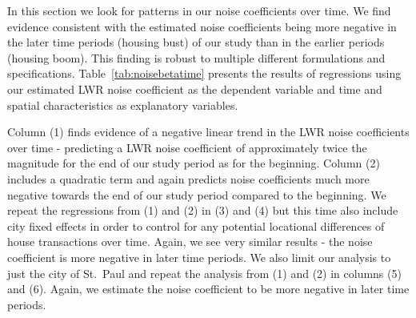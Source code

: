 \documentclass{article}\usepackage{graphicx, color}
\begin{document}
In this section we look for patterns in our noise coefficients over time. We find evidence consistent with the estimated noise coefficients being more negative in the later time periods (housing bust) of our study than in the earlier periods (housing boom). This finding is robust to multiple different formulations and specifications. Table~\ref{tab:noisebetatime} presents the results of regressions using our estimated LWR noise coefficient as the dependent variable and time and spatial characteristics as explanatory variables.

Column (1) finds evidence of a negative linear trend in the LWR noise coefficients over time - predicting a LWR noise coefficient of approximately twice the magnitude for the end of our study period as for the beginning. Column (2) includes a quadratic term and again predicts noise coefficients much more negative towards the end of our study period compared to the beginning. We repeat the regressions from (1) and (2) in (3) and (4) but this time also include city fixed effects in order to control for any potential locational differences of house transactions over time. Again, we see very similar results - the noise coefficient is more negative in later time periods. We also limit our analysis to just the city of St.\ Paul and repeat the analysis from (1) and (2) in columns (5) and (6). Again, we estimate the noise coefficient to be more negative in later time periods.
\end{document}
